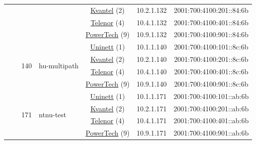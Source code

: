 \begin{small}
\begin{center}
\begin{longtable}{|c|c|c|c|c|c|c|c|}
  &  &  &  & \multicolumn{2}{|c|}{\tiny{\href{http://kvantel.no}{Kvantel} (2)}} & \tiny{10.2.1.132} & \tiny{2001:700:4100:201::84:6b} \\* \cline{5-5}\cline{6-6}\cline{7-7}\cline{8-8}
  &  &  &  & \multicolumn{2}{|c|}{\tiny{\href{https://www.telenor.no}{Telenor} (4)}} & \tiny{10.4.1.132} & \tiny{2001:700:4100:401::84:6b} \\* \cline{5-5}\cline{6-6}\cline{7-7}\cline{8-8}
  &  &  &  & \multicolumn{2}{|c|}{\tiny{\href{http://www.powertech.no}{PowerTech} (9)}} & \tiny{10.9.1.132} & \tiny{2001:700:4100:901::84:6b} \\* \cline{3-3}\cline{4-4}\cline{5-5}\cline{6-6}\cline{7-7}\cline{8-8}
  &  & \multirow{4}{*}{\tiny{140}} & \multicolumn{1}{|l|}{\multirow{4}{*}{\tiny{hu-multipath}}} & \multicolumn{2}{|c|}{\tiny{\href{https://www.uninett.no}{Uninett} (1)}} & \tiny{10.1.1.140} & \tiny{2001:700:4100:101::8c:6b} \\* \cline{5-5}\cline{6-6}\cline{7-7}\cline{8-8}
  &  &  &  & \multicolumn{2}{|c|}{\tiny{\href{http://kvantel.no}{Kvantel} (2)}} & \tiny{10.2.1.140} & \tiny{2001:700:4100:201::8c:6b} \\* \cline{5-5}\cline{6-6}\cline{7-7}\cline{8-8}
  &  &  &  & \multicolumn{2}{|c|}{\tiny{\href{https://www.telenor.no}{Telenor} (4)}} & \tiny{10.4.1.140} & \tiny{2001:700:4100:401::8c:6b} \\* \cline{5-5}\cline{6-6}\cline{7-7}\cline{8-8}
  &  &  &  & \multicolumn{2}{|c|}{\tiny{\href{http://www.powertech.no}{PowerTech} (9)}} & \tiny{10.9.1.140} & \tiny{2001:700:4100:901::8c:6b} \\* \cline{3-3}\cline{4-4}\cline{5-5}\cline{6-6}\cline{7-7}\cline{8-8}
  &  & \multirow{4}{*}{\tiny{171}} & \multicolumn{1}{|l|}{\multirow{4}{*}{\tiny{ntnu-test}}} & \multicolumn{2}{|c|}{\tiny{\href{https://www.uninett.no}{Uninett} (1)}} & \tiny{10.1.1.171} & \tiny{2001:700:4100:101::ab:6b} \\* \cline{5-5}\cline{6-6}\cline{7-7}\cline{8-8}
  &  &  &  & \multicolumn{2}{|c|}{\tiny{\href{http://kvantel.no}{Kvantel} (2)}} & \tiny{10.2.1.171} & \tiny{2001:700:4100:201::ab:6b} \\* \cline{5-5}\cline{6-6}\cline{7-7}\cline{8-8}
  &  &  &  & \multicolumn{2}{|c|}{\tiny{\href{https://www.telenor.no}{Telenor} (4)}} & \tiny{10.4.1.171} & \tiny{2001:700:4100:401::ab:6b} \\* \cline{5-5}\cline{6-6}\cline{7-7}\cline{8-8}
  &  &  &  & \multicolumn{2}{|c|}{\tiny{\href{http://www.powertech.no}{PowerTech} (9)}} & \tiny{10.9.1.171} & \tiny{2001:700:4100:901::ab:6b} \\* \cline{3-3}\cline{4-4}\cline{5-5}\cline{6-6}\cline{7-7}\cline{8-8}

\end{longtable}
\end{center}
\end{small}
